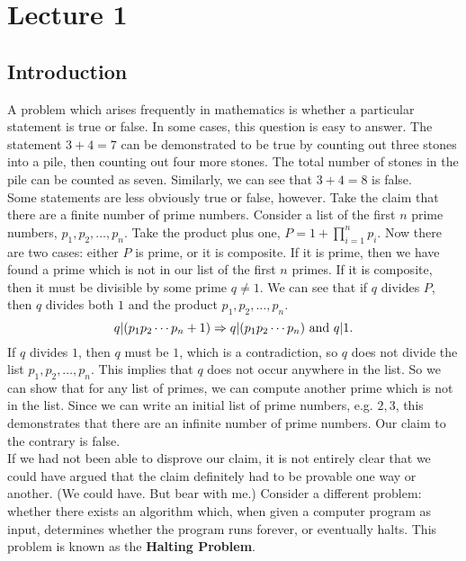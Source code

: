 \chapter{Lecture 1}

\section{Introduction}
A problem which arises frequently in mathematics is whether a particular statement is true or false. In some cases, this question is easy to answer. The statement $3 + 4 = 7$ can be demonstrated to be true by counting out three stones into a pile, then counting out four more stones. The total number of stones in the pile can be counted as seven. Similarly, we can see that $3 + 4 = 8$ is false.\\

Some statements are less obviously true or false, however. Take the claim that there are a finite number of prime numbers. Consider a list of the first $n$ prime numbers, $p_1,p_2,\ldots,p_n$. Take the product plus one, $P = 1+\prod_{i=1}^{n}p_i$. Now there are two cases: either $P$ is prime, or it is composite. If it is prime, then we have found a prime which is not in our list of the first $n$ primes. If it is composite, then it must be divisible by some prime $q \not=1$. We can see that if $q$ divides $P$, then $q$ divides both $1$ and the product $p_1,p_2,\ldots,p_n$.\\
\begin{equation*}
  q|(p_1p_2\cdots p_n + 1) \Rightarrow q|(p_1p_2\cdots p_n)\hbox{ and } q|1.
\end{equation*}
If $q$ divides $1$, then $q$ must be $1$, which is a contradiction, so $q$ does not divide the list $p_1,p_2,\ldots,p_n$. This implies that $q$ does not occur anywhere in the list. So we can show that for any list of primes, we can compute another prime which is not in the list. Since we can write an initial list of prime numbers, e.g. $2,3$, this demonstrates that there are an infinite number of prime numbers. Our claim to the contrary is false.\\

If we had not been able to disprove our claim, it is not entirely clear that we could have argued that the claim definitely had to be provable one way or another. (We could have. But bear with me.) Consider a different problem: whether there exists an algorithm which, when given a computer program as input, determines whether the program runs forever, or eventually halts. This problem is known as the \textbf{Halting Problem}.\\

